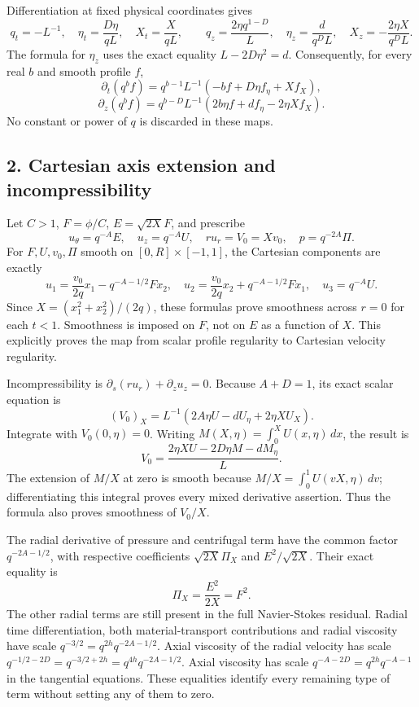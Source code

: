 \documentclass[10pt,a4paper]{article}
\begin{document}
Differentiation at fixed physical coordinates gives
\[
q_t=-L^{-1},\quad \eta_t=\frac{D\eta}{qL},\quad X_t=\frac X{qL},
\qquad q_z=\frac{2\eta q^{1-D}}L,
\quad \eta_z=\frac d{q^DL},\quad X_z=-\frac{2\eta X}{q^DL}.
\]
The formula for \(\eta_z\) uses the exact equality \(L-2D\eta^2=d\). Consequently, for every real \(b\) and smooth profile \(f\),
\[
\partial_t(q^bf)=q^{b-1}L^{-1}(-bf+D\eta f_\eta+Xf_X),
\]
\[
\partial_z(q^bf)=q^{b-D}L^{-1}(2b\eta f+df_\eta-2\eta Xf_X).
\]
No constant or power of \(q\) is discarded in these maps.

\subsection{2. Cartesian axis extension and incompressibility}

Let \(C>1\), \(F=\phi/C\), \(E=\sqrt{2X}F\), and prescribe
\[
u_\theta=q^{-A}E,\quad u_z=q^{-A}U,\quad ru_r=V_0=Xv_0,
\quad p=q^{-2A}\Pi.
\]
For \(F,U,v_0,\Pi\) smooth on \([0,R]\times[-1,1]\), the Cartesian components are exactly
\[
u_1=\frac{v_0}{2q}x_1-q^{-A-1/2}Fx_2,
\quad u_2=\frac{v_0}{2q}x_2+q^{-A-1/2}Fx_1,
\quad u_3=q^{-A}U.
\]
Since \(X=(x_1^2+x_2^2)/(2q)\), these formulas prove smoothness across \(r=0\) for each \(t<1\). Smoothness is imposed on \(F\), not on \(E\) as a function of \(X\). This explicitly proves the map from scalar profile regularity to Cartesian velocity regularity.

Incompressibility is
\(\partial_s(ru_r)+\partial_zu_z=0\). Because \(A+D=1\), its exact scalar equation is
\[
(V_0)_X=L^{-1}(2A\eta U-dU_\eta+2\eta XU_X).
\]
Integrate with \(V_0(0,\eta)=0\). Writing \(M(X,\eta)=\int_0^XU(x,\eta)\,dx\), the result is
\[
V_0=\frac{2\eta XU-2D\eta M-dM_\eta}{L}.
\]
The extension of \(M/X\) at zero is smooth because
\(M/X=\int_0^1U(vX,\eta)\,dv\); differentiating this integral proves every mixed derivative assertion. Thus the formula also proves smoothness of \(V_0/X\).

The radial derivative of pressure and centrifugal term have the common factor \(q^{-2A-1/2}\), with respective coefficients \(\sqrt{2X}\Pi_X\) and \(E^2/\sqrt{2X}\). Their exact equality is
\[
\Pi_X=\frac{E^2}{2X}=F^2.
\]
The other radial terms are still present in the full Navier-Stokes residual. Radial time differentiation, both material-transport contributions and radial viscosity have scale \(q^{-3/2}=q^{2h}q^{-2A-1/2}\). Axial viscosity of the radial velocity has scale \(q^{-1/2-2D}=q^{-3/2+2h}=q^{4h}q^{-2A-1/2}\). Axial viscosity has scale \(q^{-A-2D}=q^{2h}q^{-A-1}\) in the tangential equations. These equalities identify every remaining type of term without setting any of them to zero.
\end{document}
